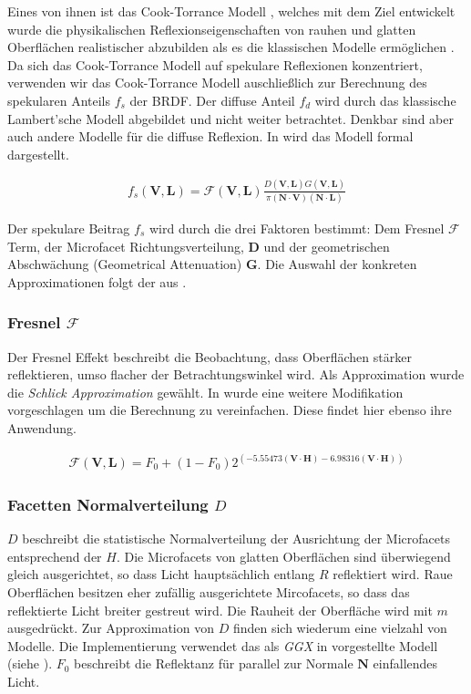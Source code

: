 Eines von ihnen ist das Cook-Torrance Modell \parencite{Cook1981}, welches mit dem Ziel entwickelt wurde die physikalischen Reflexionseigenschaften von rauhen und glatten Oberflächen realistischer abzubilden als es die klassischen Modelle ermöglichen \parencite[Seite 40]{Ngan2004}. Da sich das Cook-Torrance Modell auf spekulare Reflexionen konzentriert, verwenden wir das Cook-Torrance Modell auschließlich zur Berechnung des spekularen Anteils $f_s$ der BRDF. Der diffuse Anteil $f_d$ wird durch das klassische Lambert'sche Modell abgebildet und nicht weiter betrachtet. Denkbar sind aber auch andere Modelle für die diffuse Reflexion. In  wird das Modell formal dargestellt.

\begin{align}
	\label{eq:cook-torrance-model}
	f_s(\mathbf V,\mathbf L) = \mathcal{F}(\mathbf V,\mathbf L)\frac{D(\mathbf V,\mathbf L)G(\mathbf V,\mathbf L)}{\pi(\mathbf N \cdot \mathbf V)(\mathbf N \cdot \mathbf L)}
\end{align}

Der spekulare Beitrag $f_s$ wird durch die drei Faktoren bestimmt: Dem Fresnel $\mathcal{F}$ Term, der Microfacet Richtungsverteilung, $\mathbf D$ und der geometrischen Abschwächung (Geometrical Attenuation) $\mathbf G$. Die Auswahl der konkreten Approximationen folgt der aus \cite[Seite 3]{Karis2013}.

\subsubsection[Fresnel]{Fresnel $\mathcal{F}$}
Der Fresnel Effekt beschreibt die Beobachtung, dass Oberflächen stärker reflektieren, umso flacher der Betrachtungswinkel wird. Als Approximation wurde die \textit{Schlick Approximation} \parencite{Schlick1994} gewählt. In \cite{Lagarde2012} wurde eine weitere Modifikation vorgeschlagen um die Berechnung zu vereinfachen. Diese findet hier ebenso ihre Anwendung.

\begin{align}
	\label{eq:fresnel-schlick}
	\mathcal F(\mathbf V,\mathbf L) = F_0  + (1 - F_0) 2^{(-5.55473 (\mathbf V \cdot \mathbf H) - 6.98316 (\mathbf V \cdot \mathbf H))}
\end{align}


\subsubsection[Facetten Normalverteilung]{Facetten Normalverteilung $D$} 
$D$ beschreibt die statistische Normalverteilung der Ausrichtung der Microfacets entsprechend der  $H$. Die Microfacets von glatten Oberflächen sind überwiegend gleich ausgerichtet, so dass Licht hauptsächlich entlang $R$ reflektiert wird. Raue Oberflächen besitzen eher zufällig ausgerichtete Mircofacets, so dass das reflektierte Licht breiter gestreut wird. Die Rauheit der Oberfläche wird mit $m$ ausgedrückt. Zur Approximation von $D$ finden sich wiederum eine vielzahl von Modelle. Die Implementierung verwendet das als \textit{GGX} in \cite{Walter2007} vorgestellte Modell (siehe ). $F_0$ beschreibt die Reflektanz für parallel zur Normale $\mathbf N$ einfallendes Licht.

